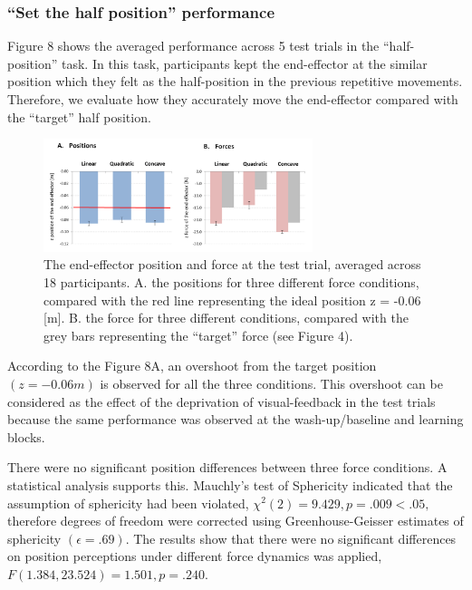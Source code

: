 \subsubsection{“Set the half position” performance}
Figure 8 shows the averaged performance across 5 test trials in the “half-position” task. In this task, participants kept the end-effector at the similar position which they felt as the half-position in the previous repetitive movements. Therefore, we evaluate how they accurately move the end-effector compared with the “target” half position.
%
\begin{figure}
	\centering
	\includegraphics[width=0.7\textwidth]{Chie/figs/Figure8.png}
	\caption{The end-effector position and force at the test trial, averaged across 18 participants. 
		A. the positions for three different force conditions, compared with the red line representing the ideal position z = -0.06 [m]. B. the force for three different conditions, compared with the grey bars representing the “target” force (see Figure 4).}
	\label{testrial}
\end{figure}
According to the Figure 8A, an overshoot  from the target position $(z = -0.06 m)$ is observed for all the three conditions. This overshoot can be considered as the effect of the deprivation of visual-feedback in the test trials because the same performance was observed at the wash-up/baseline and learning blocks.

There were no significant position differences between three force conditions. A statistical analysis supports this. Mauchly’s test of Sphericity indicated that the assumption of sphericity had been violated, $\chi^2 (2) = 9.429, p = .009 < .05, $ therefore degrees of freedom were corrected using Greenhouse-Geisser estimates of sphericity $(\epsilon = .69)$. The results show that there were no significant differences on position perceptions under different force dynamics was applied, $F(1.384, 23.524) = 1.501, p = .240$.

